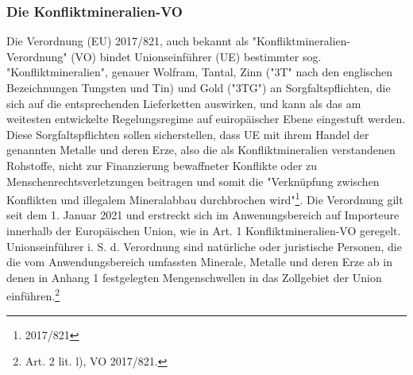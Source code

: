 \documentclass[12pt,a4paper,oneside]{book} %
\begin{document}
	\subsubsection{Die Konfliktmineralien-VO}
	Die Verordnung (EU) 2017/821, auch bekannt als "Konfliktmineralien-Verordnung" (VO) bindet Unionseinführer (UE) bestimmter sog. "Konfliktmineralien", genauer Wolfram, Tantal, Zinn ("3T" nach den englischen Bezeichnungen Tungsten und Tin) und Gold ("3TG") an Sorgfaltspflichten, die sich auf die entsprechenden Lieferketten auswirken, und kann als das am weitesten entwickelte Regelungsregime auf euiropäischer Ebene eingestuft werden\autocite{Kalls, ZfPW 2024, 181, 199}. Diese Sorgfaltspflichten sollen sicherstellen, dass UE mit ihrem Handel der genannten Metalle und deren Erze, also die als Konfliktmineralien verstandenen Rohstoffe, nicht zur Finanzierung bewaffneter Konflikte oder zu Menschenrechtsverletzungen beitragen und somit die "Verknüpfung zwischen Konflikten und illegalem Mineralabbau durchbrochen wird"\footnote{2017/821}. Die Verordnung gilt seit dem 1. Januar 2021 und erstreckt sich im Anwenungsbereich auf Importeure innerhalb der Europäischen Union, wie in Art. 1 Konfliktmineralien-VO geregelt. Unionseinführer i. S. d. Verordnung sind natürliche oder juristische Personen, die die vom Anwendungsbereich umfassten Minerale, Metalle und deren Erze ab in denen in Anhang 1 festgelegten Mengenschwellen in das Zollgebiet der Union einführen.\footnote{Art. 2 lit. l), VO 2017/821.} 
	
\end{document}
